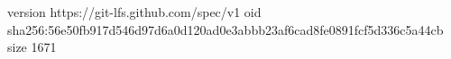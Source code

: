version https://git-lfs.github.com/spec/v1
oid sha256:56e50fb917d546d97d6a0d120ad0e3abbb23af6cad8fe0891fcf5d336c5a44cb
size 1671
